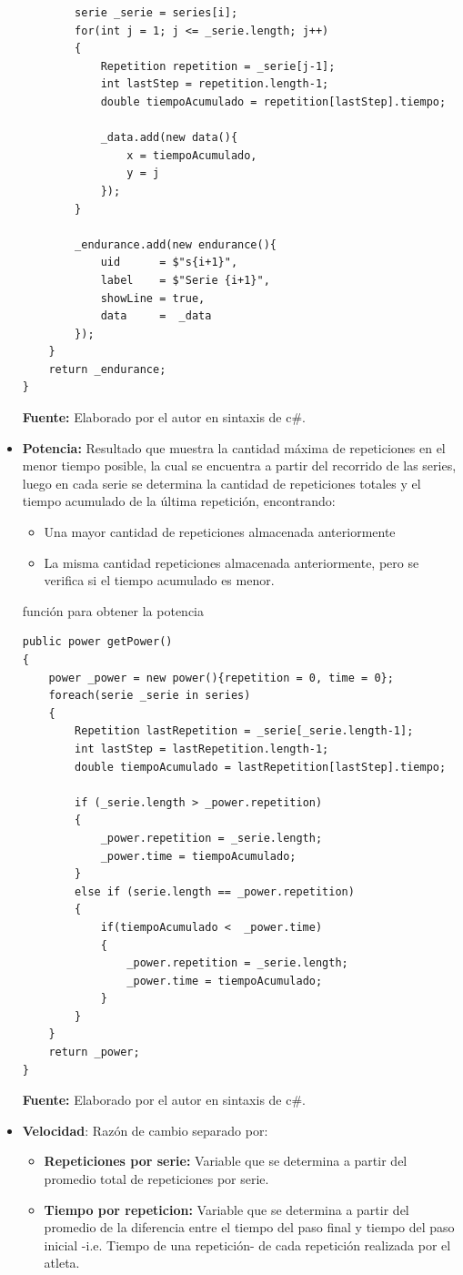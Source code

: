 \begin{itemize}
\begin{code}[H]
\begin{lstlisting}
		serie _serie = series[i];
		for(int j = 1; j <= _serie.length; j++)
		{
			Repetition repetition = _serie[j-1];
			int lastStep = repetition.length-1;
			double tiempoAcumulado = repetition[lastStep].tiempo;

			_data.add(new data(){
				x = tiempoAcumulado,
				y = j
			});
		}
		
		_endurance.add(new endurance(){
			uid      = $"s{i+1}",
			label    = $"Serie {i+1}",
			showLine = true,
			data     =  _data
		});
	}
	return _endurance;
}
	\end{lstlisting}
	\textbf{Fuente:} Elaborado por el autor en sintaxis de c\#.
\end{code} 

\item \textbf{Potencia:} Resultado que muestra la cantidad m\'axima de repeticiones en el menor tiempo posible, la cual se encuentra a partir del recorrido de las series, luego en cada serie se determina la cantidad de repeticiones totales y el tiempo acumulado de la \'ultima repetici\'on, encontrando: 
	\begin{itemize}
	\item Una mayor cantidad de repeticiones almacenada anteriormente
	\item La misma cantidad repeticiones almacenada anteriormente, pero se verifica si el tiempo acumulado es menor.
	\end{itemize}
\begin{code}[H]
	\caption{funci\'on para obtener la potencia}
	\label{code:getEndurance}
	\begin{lstlisting}
public power getPower()
{
	power _power = new power(){repetition = 0, time = 0};
	foreach(serie _serie in series)
	{
		Repetition lastRepetition = _serie[_serie.length-1];
		int lastStep = lastRepetition.length-1;
		double tiempoAcumulado = lastRepetition[lastStep].tiempo;
		
		if (_serie.length > _power.repetition)
		{
			_power.repetition = _serie.length;
			_power.time = tiempoAcumulado;
		} 
		else if (serie.length == _power.repetition)
		{
			if(tiempoAcumulado <  _power.time)
			{
				_power.repetition = _serie.length;
				_power.time = tiempoAcumulado;
			}
		}
	}
	return _power;
}
	\end{lstlisting}
	\textbf{Fuente:} Elaborado por el autor en sintaxis de c\#.
\end{code} 

\item \textbf{Velocidad}: Raz\'on de cambio separado por:
	\begin{itemize}
	\item \textbf{Repeticiones por serie:} Variable que se determina a partir del promedio total de repeticiones por serie.
		\item \textbf{Tiempo por repeticion:} Variable que se determina a partir del promedio de la diferencia entre el tiempo del paso final y tiempo del paso inicial -i.e. Tiempo de una repetici\'on- de cada repetici\'on realizada por el atleta.
	\end{itemize}
\end{itemize}


